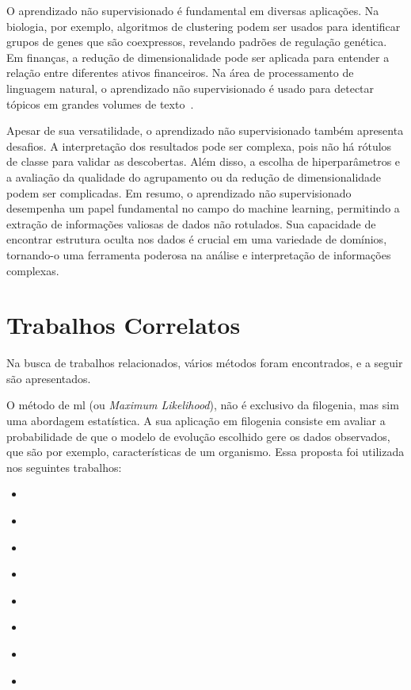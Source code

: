 O aprendizado não supervisionado é fundamental em diversas aplicações. Na biologia, por exemplo, algoritmos de clustering podem ser usados para identificar grupos de genes que são coexpressos, revelando padrões de regulação genética. Em finanças, a redução de dimensionalidade pode ser aplicada para entender a relação entre diferentes ativos financeiros. Na área de processamento de linguagem natural, o aprendizado não supervisionado é usado para detectar tópicos em grandes volumes de texto~\cite{bioinformatics_david_2004}.


Apesar de sua versatilidade, o aprendizado não supervisionado também apresenta desafios. A interpretação dos resultados pode ser complexa, pois não há rótulos de classe para validar as descobertas. Além disso, a escolha de hiperparâmetros e a avaliação da qualidade do agrupamento ou da redução de dimensionalidade podem ser complicadas.
Em resumo, o aprendizado não supervisionado desempenha um papel fundamental no campo do machine learning, permitindo a extração de informações valiosas de dados não rotulados. Sua capacidade de encontrar estrutura oculta nos dados é crucial em uma variedade de domínios, tornando-o uma ferramenta poderosa na análise e interpretação de informações complexas\cite{learning_kernels_scholkopf_2002}.

\section{Trabalhos Correlatos}

Na busca de trabalhos relacionados, vários métodos foram encontrados, e a seguir são apresentados.

O método de \gls{ml} (ou \textit{Maximum Likelihood}), não é exclusivo da filogenia, mas sim uma abordagem estatística. A sua aplicação em filogenia consiste em avaliar a probabilidade de que o modelo de evolução escolhido gere os dados observados, que são por exemplo, características de um organismo. Essa proposta foi utilizada nos seguintes trabalhos:
\begin{itemize}
  \item \textit{\citeauthor{behl_threat_2022}}
  \item \textit{\citeauthor{fall_genetic_diversity_2021}}
  \item \textit{\citeauthor{shabbir_comprehensive_2020}}
  \item \textit{\citeauthor{hudu_hepatitis_2018}}
  \item \textit{\citeauthor{sallard_tracing_2021}}
  \item \textit{\citeauthor{paez-espino_diversity_evolution_2019}}
  \item \textit{\citeauthor{tang_evolutionary_2021}}
  \item \textit{\citeauthor{cho_analysis_2022}}
\end{itemize}

